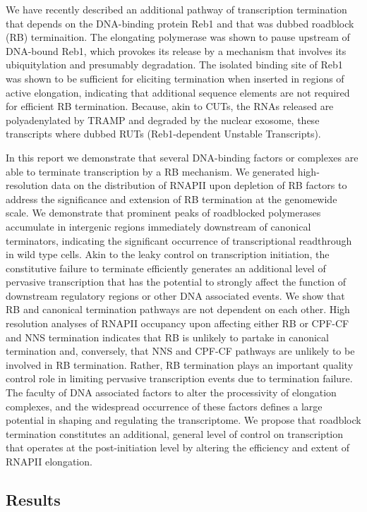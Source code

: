 We have recently described an additional pathway of transcription termination that depends on the DNA-binding protein Reb1 and that was dubbed roadblock (RB) terminaition. The elongating polymerase was shown to pause upstream of DNA-bound Reb1, which provokes its release by a mechanism that involves its ubiquitylation and presumably degradation. The isolated binding site of Reb1 was shown to be sufficient for eliciting termination when inserted in regions of active elongation, indicating that additional sequence elements are not required for efficient RB termination.  Because, akin to CUTs, the RNAs released are polyadenylated by TRAMP and degraded by the nuclear exosome, these transcripts where dubbed RUTs (Reb1-dependent Unstable Transcripts).  

In this report we demonstrate that several DNA-binding factors or complexes are able to terminate transcription by a RB mechanism. We generated high-resolution data on the distribution of RNAPII upon depletion of RB factors to address the significance and extension of RB termination at the genomewide scale.  We demonstrate that prominent peaks of roadblocked polymerases accumulate in intergenic regions immediately downstream of canonical terminators, indicating the significant occurrence of transcriptional readthrough in wild type cells. Akin to the leaky control on transcription initiation, the constitutive failure to terminate efficiently generates an additional level of pervasive transcription that has the potential to strongly affect the function of downstream regulatory regions or other DNA associated events. 
We show that RB and canonical termination pathways are not dependent on each other. High resolution analyses of RNAPII occupancy upon affecting either RB or CPF-CF and NNS termination indicates that RB is unlikely to partake in canonical termination and, conversely, that NNS and CPF-CF pathways are unlikely to be involved in RB termination. Rather, RB termination plays an important quality control role in limiting pervasive transcription events due to termination failure.  
The faculty of DNA associated factors to alter the processivity of elongation complexes, and the widespread occurrence of these factors defines a large potential in shaping and regulating the transcriptome. We propose that roadblock termination constitutes an additional, general level of control on transcription that operates at the post-initiation level by altering the efficiency and extent of RNAPII elongation. 

\subsection{Results}

